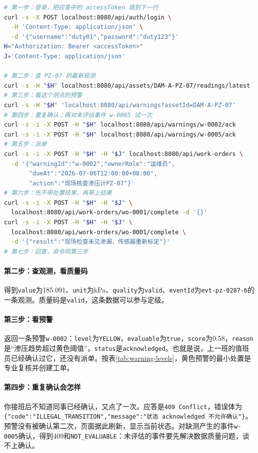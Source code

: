 \begin{lstlisting}[label={lst:ch08-closeloop-curl},language=bash,caption={PZ-07 处置七步的请求命令}]
# 第一步：登录，把应答中的 accessToken 填到下一行
curl -s -X POST localhost:8080/api/auth/login \
  -H 'Content-Type: application/json' \
  -d '{"username":"duty01","password":"duty123"}'
H="Authorization: Bearer <accessToken>"
J='Content-Type: application/json'

# 第二步：查 PZ-07 的最新观测
curl -s -H "$H" localhost:8080/api/assets/DAM-A-PZ-07/readings/latest
# 第三步：看这个测点的预警
curl -s -H "$H" 'localhost:8080/api/warnings?assetId=DAM-A-PZ-07'
# 第四步：重复确认；再对未评估事件 w-0005 试一次
curl -s -i -X POST -H "$H" localhost:8080/api/warnings/w-0002/ack
curl -s -i -X POST -H "$H" localhost:8080/api/warnings/w-0005/ack
# 第五步：派单
curl -s -i -X POST -H "$H" -H "$J" localhost:8080/api/work-orders \
  -d '{"warningId":"w-0002","ownerRole":"运维员",
       "dueAt":"2026-07-06T12:00:00+08:00",
       "action":"现场核查渗压计PZ-07"}'
# 第六步：先不带处置结果，再带上结果
curl -s -i -X POST -H "$H" -H "$J" \
  localhost:8080/api/work-orders/wo-0001/complete -d '{}'
curl -s -i -X POST -H "$H" -H "$J" \
  localhost:8080/api/work-orders/wo-0001/complete \
  -d '{"result":"现场检查未见渗漏，传感器重新标定"}'
# 第七步：回查，命令同第三步
\end{lstlisting}

\paragraph{第二步：查观测，看质量码}得到\texttt{value}为185.091、\texttt{unit}为kPa、\texttt{quality}为\texttt{valid}、\texttt{eventId}为\texttt{evt-pz-0287-6}的一条观测。质量码是\texttt{valid}，这条数据可以参与定级。

\paragraph{第三步：看预警}返回一条预警\texttt{w-0002}：\texttt{level}为\texttt{YELLOW}，\texttt{evaluable}为\texttt{true}，\texttt{score}为0.58，\texttt{reason}是“渗压趋势超过黄色阈值”，\texttt{status}是\texttt{acknowledged}。也就是说，上一班的值班员已经确认过它，还没有派单。按表\ref{tab:warning-levels}，黄色预警的最小处置是专业复核并创建工单。

\paragraph{第四步：重复确认会怎样}你接班后不知道同事已经确认，又点了一次。应答是\texttt{409 Conflict}，错误体为\texttt{\{"code":"ILLEGAL\_TRANSITION","message":"状态 acknowledged 不允许确认"\}}。预警没有被确认第二次，页面据此刷新，显示当前状态。对缺测产生的事件\texttt{w-0005}确认，得到409和\texttt{NOT\_EVALUABLE}：未评估的事件要先解决数据质量问题，谈不上确认。


